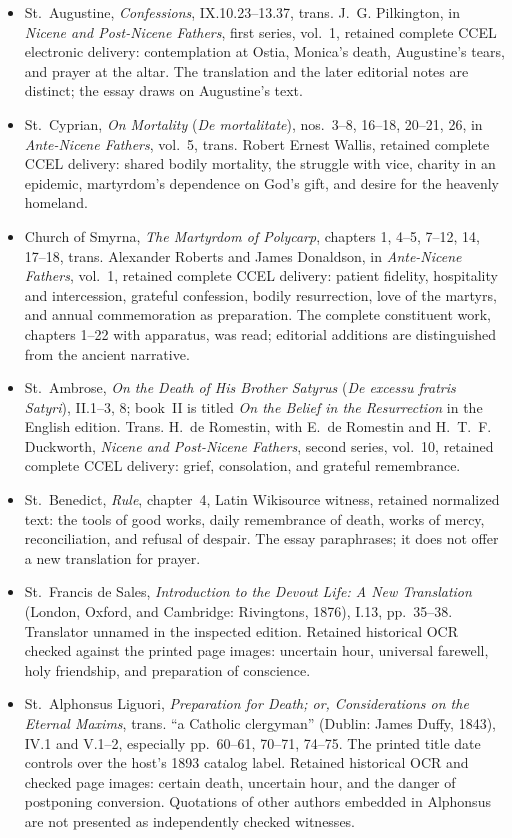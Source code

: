 \begin{itemize}[leftmargin=1.25em,itemsep=0.2em]
\item St.~Augustine, \emph{Confessions}, IX.10.23--13.37, trans. J.~G. Pilkington, in \emph{Nicene and Post-Nicene Fathers}, first series, vol.~1, retained complete CCEL electronic delivery: contemplation at Ostia, Monica's death, Augustine's tears, and prayer at the altar. The translation and the later editorial notes are distinct; the essay draws on Augustine's text.
\item St.~Cyprian, \emph{On Mortality} (\emph{De mortalitate}), nos.~3--8, 16--18, 20--21, 26, in \emph{Ante-Nicene Fathers}, vol.~5, trans. Robert Ernest Wallis, retained complete CCEL delivery: shared bodily mortality, the struggle with vice, charity in an epidemic, martyrdom's dependence on God's gift, and desire for the heavenly homeland.
\item Church of Smyrna, \emph{The Martyrdom of Polycarp}, chapters 1, 4--5, 7--12, 14, 17--18, trans. Alexander Roberts and James Donaldson, in \emph{Ante-Nicene Fathers}, vol.~1, retained complete CCEL delivery: patient fidelity, hospitality and intercession, grateful confession, bodily resurrection, love of the martyrs, and annual commemoration as preparation. The complete constituent work, chapters 1--22 with apparatus, was read; editorial additions are distinguished from the ancient narrative.
\item St.~Ambrose, \emph{On the Death of His Brother Satyrus} (\emph{De excessu fratris Satyri}), II.1--3, 8; book~II is titled \emph{On the Belief in the Resurrection} in the English edition. Trans. H.~de Romestin, with E.~de Romestin and H.~T.~F. Duckworth, \emph{Nicene and Post-Nicene Fathers}, second series, vol.~10, retained complete CCEL delivery: grief, consolation, and grateful remembrance.
\item St.~Benedict, \emph{Rule}, chapter~4, Latin Wikisource witness, retained normalized text: the tools of good works, daily remembrance of death, works of mercy, reconciliation, and refusal of despair. The essay paraphrases; it does not offer a new translation for prayer.
\item St.~Francis de Sales, \emph{Introduction to the Devout Life: A New Translation} (London, Oxford, and Cambridge: Rivingtons, 1876), I.13, pp.~35--38. Translator unnamed in the inspected edition. Retained historical OCR checked against the printed page images: uncertain hour, universal farewell, holy friendship, and preparation of conscience.
\item St.~Alphonsus Liguori, \emph{Preparation for Death; or, Considerations on the Eternal Maxims}, trans. ``a Catholic clergyman'' (Dublin: James Duffy, 1843), IV.1 and V.1--2, especially pp.~60--61, 70--71, 74--75. The printed title date controls over the host's 1893 catalog label. Retained historical OCR and checked page images: certain death, uncertain hour, and the danger of postponing conversion. Quotations of other authors embedded in Alphonsus are not presented as independently checked witnesses.

\end{itemize}
